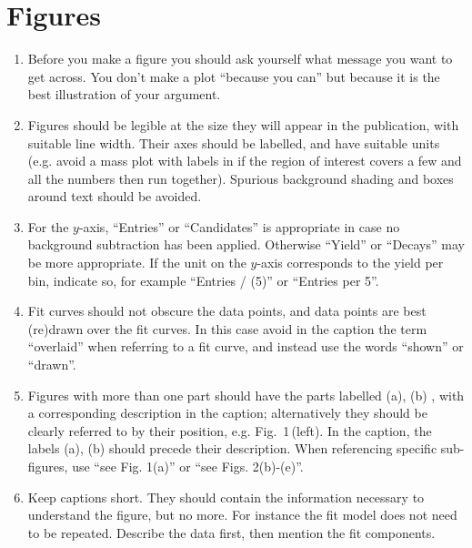\section{Figures}
\label{sec:Figures}


\begin{enumerate}
\item Before you make a figure you should ask yourself what message
  you want to get across. You don't make a plot ``because you can''
  but because it is the best illustration of your argument. 
  
\item Figures should be legible at the size they will appear in the
  publication, with suitable line width.  Their axes should be
  labelled, and have suitable units (e.g. avoid a mass plot with
  labels in \mevcc if the region of interest covers a few \gevcc
  and all the numbers then run together).  Spurious background shading
  and boxes around text should be avoided.

\item For the $y$-axis, ``Entries'' or ``Candidates'' is appropriate in case no
background subtraction has been applied. Otherwise ``Yield'' or ``Decays''
may be more appropriate. If the unit on the $y$-axis corresponds to 
the yield per bin, indicate so, for example ``Entries / (5\mevcc)'' or ``Entries per 5\mevcc''.


\item Fit curves should not obscure the data points, and
   data points are best (re)drawn over the fit curves. In this
   case avoid in the caption the term ``overlaid'' when
   referring to a fit curve, and instead use the words  
   ``shown'' or ``drawn''.

\item Figures with more than one part should have the parts labelled
  (a), (b) \etc, with a corresponding description in the caption;
  alternatively they should be clearly referred to by their position,
  e.g. Fig.~1\,(left). In the caption, the labels (a), (b) \etc should
  precede their description. When referencing specific sub-figures,
  use ``see Fig. 1(a)'' or ``see Figs. 2(b)-(e)''.

\item Keep captions short. They should contain the information necessary to understand the figure, but no more. For instance the fit model does not need to be repeated. Describe the data first, then mention the fit components.

\end{enumerate}

